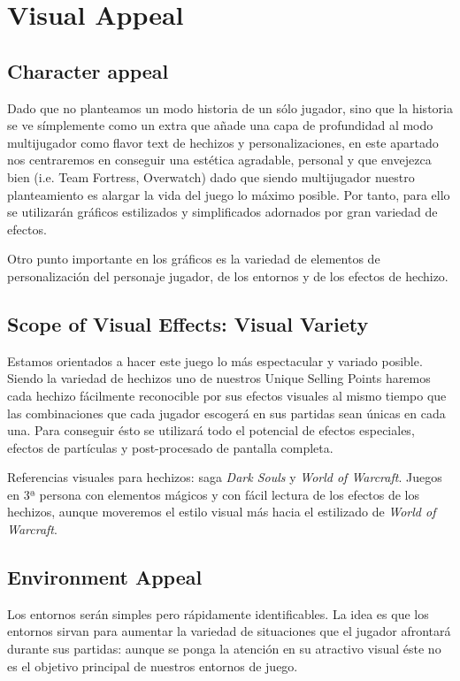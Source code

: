 \documentclass[12pt]{report}
\begin{document}
\section{Visual Appeal}

\subsection{Character appeal}

Dado que no planteamos un modo historia de un sólo jugador, sino que la historia se ve símplemente como un extra que añade una capa de profundidad al modo multijugador como flavor text de hechizos y personalizaciones, en este apartado nos centraremos en conseguir una estética agradable, personal y que envejezca bien (i.e. Team Fortress, Overwatch) dado que siendo multijugador nuestro planteamiento es alargar la vida del juego lo máximo posible. Por tanto, para ello se utilizarán gráficos estilizados y simplificados adornados por gran variedad de efectos.

Otro punto importante en los gráficos es la variedad de elementos de personalización del personaje jugador, de los entornos y de los efectos de hechizo.

\subsection{Scope of Visual Effects: Visual Variety}

Estamos orientados a hacer este juego lo más espectacular y variado posible. Siendo la variedad de hechizos uno de nuestros Unique Selling Points haremos cada hechizo fácilmente reconocible por sus efectos visuales al mismo tiempo que las combinaciones que cada jugador escogerá en sus partidas sean únicas en cada una. Para conseguir ésto se utilizará todo el potencial de efectos especiales, efectos de partículas y post-procesado de pantalla completa.

Referencias visuales para hechizos: saga \textit{Dark Souls} y \textit{World of Warcraft}. Juegos en 3ª persona con elementos mágicos y con fácil lectura de los efectos de los hechizos, aunque moveremos el estilo visual más hacia el estilizado de \textit{World of Warcraft}.

\subsection{Environment Appeal}

Los entornos serán simples pero rápidamente identificables. La idea es que los entornos sirvan para aumentar la variedad de situaciones que el jugador afrontará durante sus partidas: aunque se ponga la atención en su atractivo visual éste no es el objetivo principal de nuestros entornos de juego.
\end{document}
